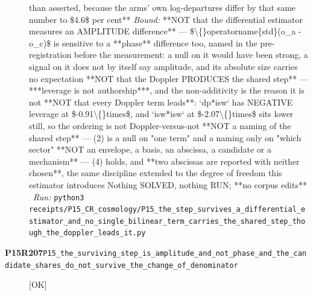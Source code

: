 \begin{description}
than asserted, because the arms' own log-departures differ by that same number to \$4.6\$ per cent**
 \emph{Bound:}  **NOT that the differential estimator measures an AMPLITUDE difference** --- \$\textbackslash\{\}operatorname\{std\}(o\_a - o\_c)\$ is sensitive to a **phase** difference too, named in the pre-registration before the measurement: a null on it would have been strong, a signal on it does not by itself say amplitude, and its absolute size carries no expectation  **NOT that the Doppler PRODUCES the shared step** --- ***leverage is not authorship***, and the non-additivity is the reason it is not  **NOT that every Doppler term leads**: `dp*isw` has NEGATIVE leverage at \$-0.91\textbackslash\{\}times\$, and `isw*isw` at \$-2.07\textbackslash\{\}times\$ sits lower still, so the ordering is not Doppler-versus-not  **NOT a naming of the shared step** --- (2) is a null on "one term" and a naming only on "which sector"  **NOT an envelope, a basis, an abscissa, a candidate or a mechanism** --- (4) holds, and **two abscissas are reported with neither chosen**, the same discipline extended to the degree of freedom this estimator introduces  Nothing SOLVED, nothing RUN; **no corpus edits**
\ \emph{Run:} \texttt{python3 receipts/P15\_CR\_cosmology/P15\_the\_step\_survives\_a\_differential\_estimator\_and\_no\_single\_bilinear\_term\_carries\_the\_shared\_step\_though\_the\_doppler\_leads\_it.py}
\item[\rcptlabel{P15_the_surviving_step_is_amplitude_and_not_phase_and_the_candidate_shares_do_not_survive_the_change_of_denominator}{P15R207}\textbf{P15R207}\quad\texttt{P15\_the\_surviving\_step\_is\_amplitude\_and\_not\_phase\_and\_the\_candidate\_shares\_do\_not\_survive\_the\_change\_of\_denominator}]\hfill\textsf{[OK]}\\

\end{description}
